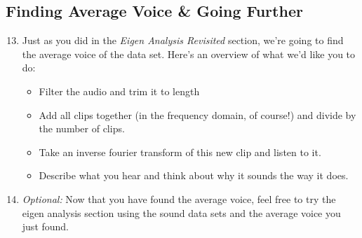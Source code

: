 \documentclass{tufte-handout}
\begin{document}
\subsection{Finding Average Voice \& Going Further}
\begin{enumerate}
	\setcounter{enumi}{12}
	\item Just as you did in the \textit{Eigen Analysis Revisited} section, we're going to find the average voice of the data set. Here's an overview of what we'd like you to do: \\ 
	\begin{itemize}
		\item Filter the audio and trim it to length
		\item Add all clips together (in the frequency domain, of course!) and divide by the number of clips. 
		\item Take an inverse fourier transform of this new clip and listen to it.
		\item Describe what you hear and think about why it sounds the way it does.
	\end{itemize}
\end{enumerate}

\begin{enumerate}
	\setcounter{enumi}{13}
	\item \textit{Optional:} Now that you have found the average voice, feel free to try the eigen analysis section using the sound data sets and the average voice you just found. 
\end{enumerate}
\end{document}
